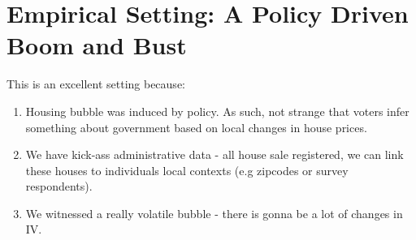 \documentclass[12pt,a4paper]{article}
\begin{document}




\section{Empirical Setting: A Policy Driven Boom and Bust}


This is an excellent setting because: 

\begin{enumerate}
	\item Housing bubble was induced by policy. As such, not strange that voters infer something about government based on local changes in house prices.
	\item We have kick-ass administrative data - all house sale registered, we can link these houses to individuals local contexts (e.g zipcodes or survey respondents).
	\item We witnessed a really volatile bubble - there is gonna be a lot of changes in IV.
\end{enumerate}




\end{document}
